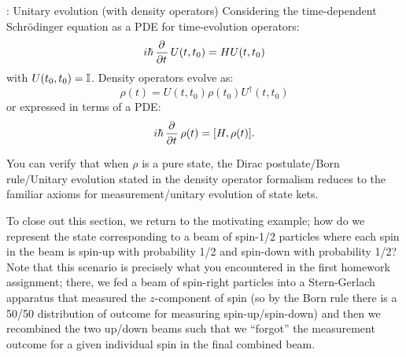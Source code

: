 \begin{axiombox}{: Unitary evolution (with density operators)}
    Considering the time-dependent Schr\"{o}dinger equation as a PDE for time-evolution operators:
    \begin{equation}
        i\hbar\dpd{}{t}U(t, t_0) = HU(t, t_0)
    \end{equation}
    with $U(t_0, t_0) = \mathbb{I}$. Density operators evolve as:
    \begin{equation}
        \rho(t) = U(t, t_0)\rho(t_0)U^\dag(t, t_0)
    \end{equation}
    or expressed in terms of a PDE:
    \begin{equation}
        i\hbar\dpd{}{t}\rho(t) = [H, \rho(t)].
    \end{equation}
\end{axiombox}

You can verify that when $\rho$ is a pure state, the Dirac postulate/Born rule/Unitary evolution stated in the density operator formalism reduces to the familiar axioms for measurement/unitary evolution of state kets.

To close out this section, we return to the motivating example; how do we represent the state corresponding to a beam of spin-1/2 particles where each spin in the beam is spin-up with probability 1/2 and spin-down with probability 1/2? Note that this scenario is precisely what you encountered in the first homework assignment; there, we fed a beam of spin-right particles into a Stern-Gerlach apparatus that measured the $z$-component of spin (so by the Born rule there is a 50/50 distribution of outcome for measuring spin-up/spin-down) and then we recombined the two up/down beams such that we ``forgot'' the measurement outcome for a given individual spin in the final combined beam.

